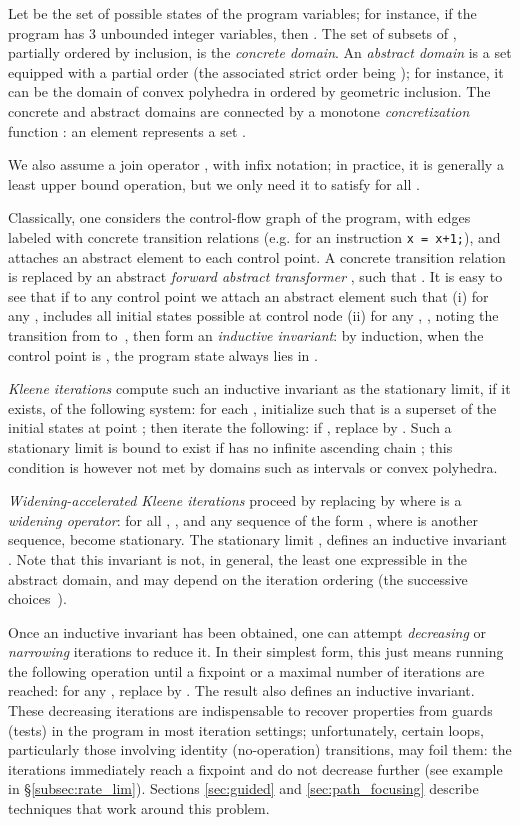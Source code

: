 Let  be the set of possible states of the program variables; for instance, if the program has 3 unbounded integer variables, then . The set  of subsets of , partially ordered by inclusion, is the \emph{concrete domain}. An \emph{abstract domain} is a set  equipped with a partial order  (the associated strict order being ); for instance, it can be the domain of convex polyhedra in  ordered by geometric inclusion. 
The concrete and abstract domains are connected by a monotone \emph{concretization} function : an element  represents a set .

We also assume a join operator , with infix notation; in practice, it is generally a least upper bound operation, but we only need it to satisfy  for all .

Classically, one considers the control-flow graph of the program, with edges labeled with concrete transition relations (e.g.  for an instruction \lstinline|x = x+1;|), and attaches an abstract element to each control point.
A concrete transition relation  is replaced by an abstract \emph{forward abstract transformer} , such that
.
It is easy to see that if to any control point  we attach an abstract element  such that
(i) for any ,  includes all initial states possible at control node 
(ii) for any , , noting  the transition from  to~, then  form an \emph{inductive invariant}: by induction, when the control point is , the program state always lies in .

\emph{Kleene iterations} compute such an inductive invariant as the stationary limit, if it exists, of the following system: for each , initialize  such that  is a superset of the initial states at point ; then iterate the following:
if , replace  by .
Such a stationary limit is bound to exist if  has no infinite ascending chain ; this condition is however not met by domains such as intervals or convex polyhedra.

\emph{Widening-accelerated Kleene iterations} proceed by replacing  by  where  is a \emph{widening operator}: for all , , and any sequence  of the form , where  is another sequence, become stationary.
The stationary limit , defines an inductive invariant . Note that this invariant is not, in general, the least one expressible in the abstract domain, and may depend on the iteration ordering (the successive choices~).

Once an inductive invariant  has been obtained,
one can attempt \emph{decreasing} or \emph{narrowing} iterations to reduce it.
In their simplest form, this just means running the following operation until a
fixpoint or a maximal number of iterations are reached: for any , replace
 by . The result also defines an inductive
invariant. These decreasing iterations are indispensable to recover properties
from guards (tests) in the program in most iteration settings; unfortunately,
certain loops, particularly those involving identity (no-operation) transitions,
may foil them: the iterations immediately reach a fixpoint and do not decrease
further (see example in \S\ref{subsec:rate_lim}). Sections \ref{sec:guided} and
\ref{sec:path_focusing} describe techniques that work around this problem.

